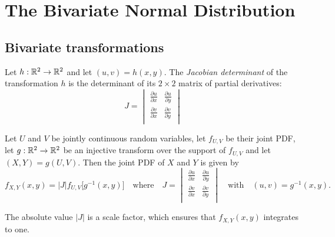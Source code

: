\chapter{The Bivariate Normal Distribution}\label{chap:bivariate_normal}
\section{Bivariate transformations}

\begin{definition}\label{def:jacobian}
Let $h:\mathbb{R}^2\to\mathbb{R}^2$ and let $(u,v) = h(x,y)$. The \emph{Jacobian determinant} of the transformation $h$ is the determinant of its $2\times 2$ matrix of partial derivatives:
\[
J = \begin{vmatrix}
\displaystyle\frac{\partial u}{\partial x} & \displaystyle\frac{\partial u}{\partial y} \\[2ex]
\displaystyle\frac{\partial v}{\partial x} & \displaystyle\frac{\partial v}{\partial y} \\[2ex]
\end{vmatrix}
\]
\end{definition}

\begin{theorem}\label{thm:bivariate_transformation_pdf}
Let $U$ and $V$ be jointly continuous random variables, let $f_{U,V}$ be their joint PDF, let $g:\mathbb{R}^2\to\mathbb{R}^2$ be an injective transform over the support of $f_{U,V}$ and let $(X,Y) = g(U,V)$. Then the joint PDF of $X$ and $Y$ is given by
\[
f_{X,Y}(x,y) = |J| f_{U,V}\big[ g^{-1}(x,y) \big] 
\quad\text{where}\quad
J = 
\begin{vmatrix}
\displaystyle\frac{\partial u}{\partial x} & \displaystyle\frac{\partial u}{\partial y} \\[2ex]
\displaystyle\frac{\partial v}{\partial x} & \displaystyle\frac{\partial v}{\partial y} \\[2ex]
\end{vmatrix}
\quad\text{with}\quad
(u,v) = g^{-1}(x,y).
\]
\end{theorem}

\begin{remark}
The absolute value $|J|$ is a scale factor, which ensures that $f_{X,Y}(x,y)$ integrates to one.
\end{remark}

